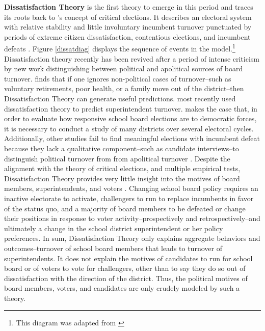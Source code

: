 \textbf{Dissatisfaction Theory} is the first theory to emerge in this period and traces its roots back to  \citet{RefWorks:348}'s concept of critical elections. It describes an electoral system with relative stability and little involuntary incumbent turnover punctuated by periods of extreme citizen dissatisfaction, contentious elections, and incumbent defeats \citep{RefWorks:297,RefWorks:271}. Figure \ref{dissatdiag} displays the sequence of events in the model.\footnote{This diagram was adapted from \citep{RefWorks:243}} Dissatisfaction theory recently has been revived after a period of intense criticism by new work distinguishing between political and apolitical sources of board turnover. \citet{RefWorks:311} finds that if one ignores non-political cases of turnover--such as voluntary retirements, poor health, or a family move out of the district--then Dissatisfaction Theory can generate useful predictions. \citet{RefWorks:311} most recently used dissatisfaction theory to predict superintendent turnover. \citet{RefWorks:345} makes the case that, in order to evaluate how responsive school board elections are to democratic forces, it is necessary to conduct a study of many districts over several electoral cycles. Additionally, other studies fail to find meaningful elections with incumbent defeat because they lack a qualitative component--such as candidate interviews--to distinguish political turnover from from apolitical turnover \citep{RefWorks:311}. Despite the alignment with the \citet{RefWorks:348} theory of critical elections, and multiple empirical tests, Dissatisfaction Theory provides very little insight into the motives of board members, superintendents, and voters \citep{RefWorks:336}. Changing school board policy requires an inactive electorate to activate, challengers to run to replace incumbents in favor of the status quo, and a majority of board members to be defeated or change their positions in response to voter activity--prospectively and retrospectively--and ultimately a change in the school district superintendent or her policy preferences. In sum, Dissatisfaction Theory only explains aggregate behaviors and outcomes--turnover of school board members that leads to turnover of superintendents. It does not explain the motives of candidates to run for school board or of voters to vote for challengers, other than to say they do so out of dissatisfaction with the direction of the district. Thus, the political motives of board members, voters, and candidates are only crudely modeled by such a theory. 

